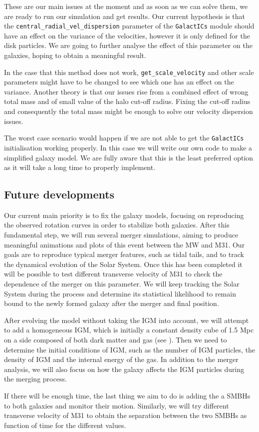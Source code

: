 \documentclass[a4paper,12pt, english]{article}
\begin{document}
\smallskip
These are our main issues at the moment and as soon as we can solve them, we are ready to run our simulation and get results. Our current hypothesis is that the \texttt{central\_radial\_vel\_dispersion} parameter of the \texttt{GalactICs} module should have an effect on the variance of the velocities, however it is only defined for the disk particles. We are going to further analyse the effect of this parameter on the galaxies, hoping to obtain a meaningful result.\par
\smallskip
In the case that this method does not work, \texttt{get\_scale\_velocity} and other scale parameters might have to be changed to see which one has an effect on the variance. Another theory is that our issues rise from a combined effect of wrong total mass and of small value of the halo cut-off radius. Fixing the cut-off radius and consequently the total mass might be enough to solve our velocity dispersion issues.\par
\smallskip
The worst case scenario would happen if we are not able to get the \texttt{GalactICs} initialisation working properly. In this case we will write our own code to make a simplified galaxy model. We are fully aware that this is the least preferred option as it will take a long time to properly implement.\par

\subsection{Future developments}
Our current main priority is to fix the galaxy models, focusing on reproducing the observed rotation curves in order to stabilize both galaxies. After this fundamental step, we will run several merger simulations, aiming to produce meaningful animations and plots of this event between the MW and M31. Our goals are to reproduce typical merger features, such as tidal tails, and to track the dynamical evolution of the Solar System. Once this has been completed it will be possible to test different transverse velocity of M31 to check the dependence of the merger on this parameter. We will keep tracking the Solar System during the process and determine its statistical likelihood to remain bound to the newly formed galaxy after the merger and final position.\par
\smallskip
After evolving the model without taking the IGM into account, we will attempt to add a homogeneous IGM, which is initially a constant density cube of 1.5 Mpc on a side composed of both dark matter and gas (see \textcite{Cox_2008}). Then we need to determine the initial conditions of IGM, such as the number of IGM particles, the density of IGM and the internal energy of the gas. In addition to the merger analysis, we will also focus on how the galaxy affects the IGM particles during the merging process.\par
\smallskip
If there will be enough time, the last thing we aim to do is adding the a SMBHs to both galaxies and monitor their motion. Similarly, we will try different transverse velocity of M31 to obtain the separation between the two SMBHs as function of time for the different values.\par
\newpage
\setlength{}
\printbibliography[heading=bibintoc,title={References}]
\end{document}
